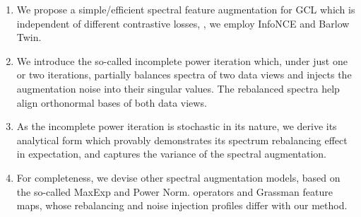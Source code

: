 \renewcommand{\labelenumi}{\roman{enumi}.}
\begin{enumerate}[leftmargin=0.5cm]
     \item We propose a simple/efficient spectral feature augmentation for GCL which is independent of different contrastive losses, \ie, we employ %
     InfoNCE and Barlow Twin.
     \vspace{-0.1cm}
     \item We introduce the so-called incomplete power iteration which, under just one or two iterations, partially  balances  spectra of two data views and injects the augmentation noise into their singular values. The rebalanced spectra help align orthonormal bases  of both data views.
     \vspace{-0.1cm}
     \item As the  incomplete power iteration is stochastic in its nature, %
     we derive its analytical form which provably demonstrates its spectrum rebalancing effect in expectation, and captures the variance of the spectral augmentation.
     \vspace{-0.1cm}
     \item For completeness, we devise other spectral augmentation models, based on the so-called MaxExp and Power Norm. operators and Grassman feature maps, whose rebalancing and noise injection profiles differ with our method. 
 \end{enumerate}
 
 
 



